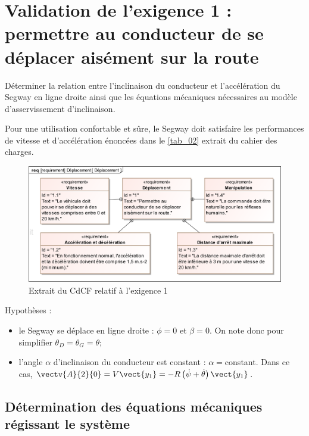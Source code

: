 \documentclass[10pt,fleqn]{article} %
\begin{document}
\section{Validation de l'exigence 1 : permettre au conducteur de se déplacer aisément sur la route}

\begin{obj}
Déterminer la relation entre l’inclinaison du conducteur et l’accélération du Segway en ligne droite ainsi que les équations mécaniques nécessaires au modèle d’asservissement d’inclinaison.
\end{obj}

\ifprof
\else

Pour une utilisation confortable et sûre, le Segway doit satisfaire les performances de vitesse et d’accélération énoncées dans le \autoref{tab_02} extrait du cahier des charges.


\begin{figure}[H]
\centering
\includegraphics[width=\linewidth]{req_01}
\caption{Extrait du CdCF relatif à l'exigence 1 \label{tab_02} }%
\end{figure}


Hypothèses :
\begin{itemize}
\item le Segway  se déplace en ligne droite : $\phi=0$ et $\beta=0$. On note donc pour simplifier $\theta_D=\theta_G = \theta$;
\item l’angle $\alpha$ d’inclinaison du conducteur est constant : $\alpha=$constant. Dans ce cas, $\vectv{A}{2}{0}=V\vect{y_1}=-R\left(\dot{\psi}+\dot{\theta}\right) \vect{y_1}$.
\end{itemize}

\fi

\subsection{Détermination des équations mécaniques régissant le système}
\end{document}
